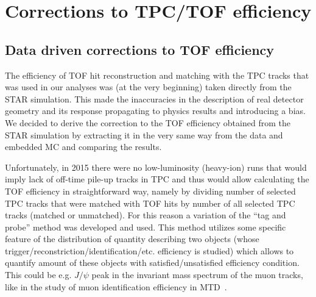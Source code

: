

\chapter{Corrections to TPC/TOF efficiency}\label{chap:tpcTofEffCorr}

\section{Data driven corrections to TOF efficiency}\label{sec:tofAbsEffCorr}

The efficiency of TOF hit reconstruction and matching with the TPC tracks that was used in our analyses was (at the very beginning) taken directly from the STAR simulation. This made the inaccuracies in the description of real detector geometry and its response propagating to physics results and introducing a bias. We decided to derive the correction to the TOF efficiency obtained from the STAR simulation by extracting it in the very same way from the data and embedded MC and comparing the results.%

Unfortunately, in 2015 there were no low-luminosity (heavy-ion) runs that would imply lack of off-time pile-up tracks in TPC and thus would allow calculating the TOF efficiency in straightforward way, namely by dividing number of selected TPC tracks that were matched with TOF hits by number of all selected TPC tracks (matched or unmatched). For this reason a variation of the ``tag and probe'' method was developed and used. This method utilizes some specific feature of the distribution of quantity describing two objects (whose trigger/reconstriction/identification/etc. efficiency is studied) which allows to quantify amount of these objects with satisfied/unsatisfied efficiency condition. This could be e.g. $J/\psi$ peak in the invariant mass spectrum of the muon tracks, like in the study of muon identification efficiency in MTD~\cite{Huang:2016dbm}. %

